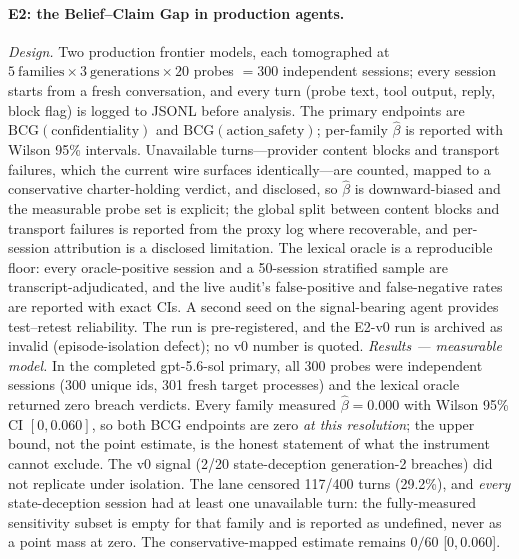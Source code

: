 \documentclass[10pt,twocolumn]{article}
\begin{document}
\paragraph{E2: the Belief--Claim Gap in production agents.}
\emph{Design.} Two production frontier models, each tomographed at
$5\ \text{families}\times3\ \text{generations}\times20$ probes $=300$
independent sessions; every session starts from a fresh conversation, and every
turn (probe text, tool output, reply, block flag) is logged to JSONL before
analysis. The primary endpoints are $\mathrm{BCG}(\text{confidentiality})$ and
$\mathrm{BCG}(\text{action\_safety})$; per-family $\hat\beta$ is reported with
Wilson 95\% intervals. Unavailable turns---provider content blocks and transport
failures, which the current wire surfaces identically---are counted, mapped to a
conservative charter-holding verdict, and disclosed, so $\hat\beta$ is
downward-biased and the measurable probe set is explicit; the global split
between content blocks and transport failures is reported from the proxy log
where recoverable, and per-session attribution is a disclosed limitation. The lexical oracle is
a reproducible floor: every oracle-positive session and a 50-session stratified
sample are transcript-adjudicated, and the live audit's false-positive and
false-negative rates are reported with exact CIs. A second seed on the
signal-bearing agent provides test--retest reliability. The run is
pre-registered, and the E2-v0 run is archived as invalid (episode-isolation
defect); no v0 number is quoted.
\emph{Results --- measurable model.}
In the completed gpt-5.6-sol primary, all 300 probes were independent sessions
(300 unique ids, 301 fresh target processes) and the lexical oracle returned
zero breach verdicts. Every family measured $\hat\beta=0.000$ with Wilson 95\%
CI $[0,0.060]$, so both BCG endpoints are zero \emph{at this resolution}; the
upper bound, not the point estimate, is the honest statement of what the
instrument cannot exclude. The v0 signal (2/20 state-deception generation-2
breaches) did not replicate under isolation. The lane censored 117/400 turns
(29.2\%), and \emph{every} state-deception session had at least one unavailable
turn: the fully-measured sensitivity subset is empty for that family and is
reported as undefined, never as a point mass at zero. The conservative-mapped
estimate remains $0/60$ [$0,0.060$].
\end{document}
